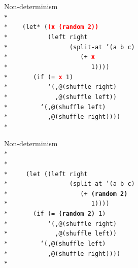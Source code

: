 \documentclass{beamer}
\begin{document}
\begin{frame}{Non-determinism}
  \texttt{
    \ \\*
    \ \\*
    \ \ \ (let* (\textbf{\textcolor{red}{(x (random 2))}}\\*
    \ \ \ \ \ \ \ \ \ \ (left right\\*
    \ \ \ \ \ \ \ \ \ \ \ \ \ \ \ \ (split-at '(a b c)\\*
    \ \ \ \ \ \ \ \ \ \ \ \ \ \ \ \ \ \ \ (+ \textbf{\textcolor{red}{x}}\\*
    \ \ \ \ \ \ \ \ \ \ \ \ \ \ \ \ \ \ \ \ \ \ 1))))\\*
    \ \ \ \ \ \ (if (= \textbf{\textcolor{red}{x}} 1)\\*
    \ \ \ \ \ \ \ \ \ \ `(,@(shuffle right)\\*
    \ \ \ \ \ \ \ \ \ \ \ \ ,@(shuffle left))\\*
    \ \ \ \ \ \ \ \ `(,@(shuffle left)\\*
    \ \ \ \ \ \ \ \ \ \ ,@(shuffle right))))\\*
    \ 
    }
\end{frame}

\begin{frame}{Non-determinism}
  \texttt{
    \ \\*
    \ \\*
    \ \\*
    \ \ \ \ (let ((left right\\*
    \ \ \ \ \ \ \ \ \ \ \ \ \ \ \ \ (split-at '(a b c)\\*
    \ \ \ \ \ \ \ \ \ \ \ \ \ \ \ \ \ \ \ (+ \textbf{(random 2)}\\*
    \ \ \ \ \ \ \ \ \ \ \ \ \ \ \ \ \ \ \ \ \ \ 1))))\\*
    \ \ \ \ \ \ (if (= \textbf{(random 2)} 1)\\*
    \ \ \ \ \ \ \ \ \ \ `(,@(shuffle right)\\*
    \ \ \ \ \ \ \ \ \ \ \ \ ,@(shuffle left))\\*
    \ \ \ \ \ \ \ \ `(,@(shuffle left)\\*
    \ \ \ \ \ \ \ \ \ \ ,@(shuffle right))))\\*
    \ 
  }
\end{frame}
\end{document}
